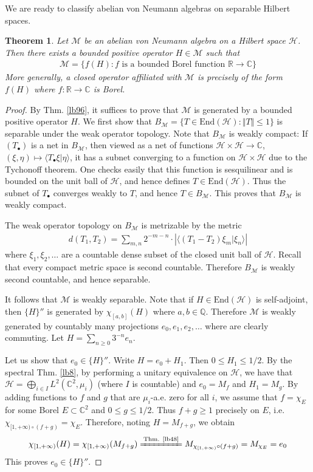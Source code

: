 \documentclass[12pt,b5paper,notitlepage]{article}
\theoremstyle{definition}
\theoremstyle{plain}
\newtheorem{thm}[df]{Theorem}
\newcommand{\mc}{\mathcal}
\newcommand{\End}{\mathrm{End}} %
\newcommand{\bk}[1]{\langle {#1}\rangle}
\newcommand{\mbb}{\mathbb}
\newcommand{\blt}{\bullet}
\newcommand{\Cbb}{\mathbb C}
\newcommand{\Rbb}{\mathbb R}
\numberwithin{equation}{section}
\begin{document}
We are ready to classify abelian von Neumann algebras on separable Hilbert spaces.

\begin{thm}\label{lb97}
Let $\mc M$ be an abelian von Neumann algebra on a  Hilbert space $\mc H$. Then there exists a bounded positive operator $H\in\mc M$ such that
\begin{align*}
\mc M=\{f(H):f\text{ is a bounded Borel function }\Rbb\rightarrow\Cbb\}
\end{align*}
More generally, a closed operator affiliated with $\mc M$ is precisely of the form $f(H)$ where $f:\Rbb\rightarrow\Cbb$ is Borel.
\end{thm}


\begin{proof}
By Thm. \ref{lb96}, it suffices to prove that $\mc M$ is generated by a bounded positive operator $H$. We first show that $B_{\mc M}=\{T\in\End(\mc H):\Vert T\Vert\leq 1\}$ is separable under the weak operator topology. Note that $B_{\mc M}$ is weakly compact: If $(T_\blt)$ is a net in $B_{\mc M}$, then viewed as a net of functions $\mc H\times\mc H\rightarrow\Cbb$, $(\xi,\eta)\mapsto\bk{T_\blt\xi|\eta}$, it has a subnet converging to a function on $\mc H\times\mc H$ due to the Tychonoff theorem. One checks easily that this function is sesquilinear and is bounded on the unit ball of $\mc H$, and hence defines $T\in\End(\mc H)$. Thus the subnet of $T_\blt$ converges weakly to $T$, and hence $T\in B_\mc M$. This proves that $B_{\mc M}$ is weakly compact.

The weak operator topology on $B_{\mc M}$ is metrizable by the metric
\begin{align*}
d(T_1,T_2)=\sum_{m,n} 2^{-m-n}\cdot|\bk{(T_1-T_2)\xi_m|\xi_n}|
\end{align*}
where $\xi_1,\xi_2,\dots$ are a countable dense subset of the closed unit ball of $\mc H$. Recall that every compact metric space is second countable. Therefore $B_{\mc M}$ is weakly second countable, and hence separable.  

It follows that $\mc M$ is weakly separable. Note that if $H\in\End(\mc H)$ is self-adjoint, then $\{H\}''$ is generated by $\chi_{[a,b]}(H)$ where $a,b\in\mbb Q$. Therefore $\mc M$ is weakly generated by countably many projections $e_0,e_1,e_2,\dots$ where are clearly commuting. Let $H=\sum_{n\geq0}3^{-n}e_n$. 

Let us show that $e_0\in\{H\}''$. Write $H=e_0+H_1$. Then $0\leq H_1\leq 1/2$. By the spectral Thm. \ref{lb8}, by performing a unitary equivalence on $\mc H$, we have that $\mc H=\bigoplus_{i\in I} L^2(\Cbb^2,\mu_i)$ (where $I$ is countable) and $e_0=M_f$ and $H_1=M_g$. By adding functions to $f$ and $g$ that are $\mu_i$-a.e. zero for all $i$, we assume that $f=\chi_E$ for some Borel $E\subset\Cbb^2$ and $0\leq g\leq 1/2$. Thus $f+g\geq 1$ precisely on $E$, i.e. $\chi_{[1,+\infty)\circ(f+g)}=\chi_E$. Therefore, noting $H=M_{f+g}$, we obtain
\begin{align*}
\chi_{[1,+\infty)}(H)=\chi_{[1,+\infty)}(M_{f+g})\xlongequal{\text{Thm. \ref{lb48}}}M_{\chi_{[1,+\infty)}\circ(f+g)}=M_{\chi_E}=e_0
\end{align*}
This proves $e_0\in\{H\}''$. 


\end{proof}
\end{document}
